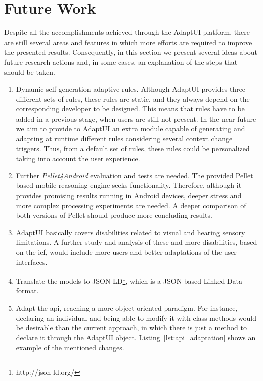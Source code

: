 \section{Future Work}
\label{sec:future_work}

Despite all the accomplishments achieved through the AdaptUI platform, there are 
still several areas and features in which more efforts are required to improve 
the presented results. Consequently, in this section we present several ideas 
about future research actions and, in some cases, an explanation of the steps 
that should be taken.

\begin{enumerate}[label=\alph*)]
  \item Dynamic self-generation adaptive rules. Although AdaptUI provides three 
  different sets of rules, these rules are static, and they always depend on 
  the corresponding developer to be designed. This means that rules have to 
  be added in a previous stage, when users are still not present. In the near 
  future we aim to provide to AdaptUI an extra module capable of generating and 
  adapting at runtime different rules considering several context change 
  triggers. Thus, from a default set of rules, these rules could be personalized 
  taking into account the user experience.
  
  \item Further \textit{Pellet4Android} evaluation and tests are needed. The
  provided Pellet based mobile reasoning engine seeks functionality. Therefore,
  although it provides promising results running in Android devices, deeper 
  stress and  more complex processing experiments are needed. A deeper
  comparison of both versions of Pellet should produce more concluding results.
  
  \item AdaptUI basically covers disabilities related to visual and hearing
  sensory limitations. A further study and analysis of these and more 
  disabilities, based on the \ac{icf}, would include more users and better 
  adaptations of the user interfaces.
  
  \item Translate the models to JSON-LD\footnote{http://json-ld.org/}, which is
  a JSON based Linked Data format.
  
  \item Adapt the \ac{api}, reaching a more object oriented paradigm. For instance,
  declaring an individual and being able to modify it with class methods would 
  be desirable than the current approach, in which there is just a method to
  declare it through the AdaptUI object. Listing~\ref{lst:api_adaptation} shows
  an example of the mentioned changes.
  

\end{enumerate}
